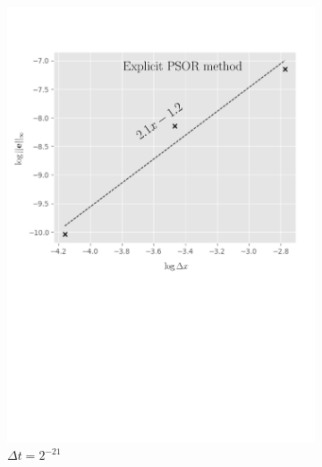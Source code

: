 \begin{figure}[tbp]
  \centering
  \begin{subfigure}{0.4\textwidth}
    \centering
    \includegraphics[width=\textwidth]{chapters/chapter5/ConvergenceSpaceExplicitLCP.pdf}
    \caption{$\Delta{x}=2^{-7},\dots,2^{-10}$}
    \caption*{$\Delta{t}=2^{-21}$}
    \label{fig:lcp:numericalresults:convergence_space_explicit}
  \end{subfigure}
  \hspace{0.5cm}
  \begin{subfigure}{0.4\textwidth}
    \centering

\end{subfigure}
\end{figure}
